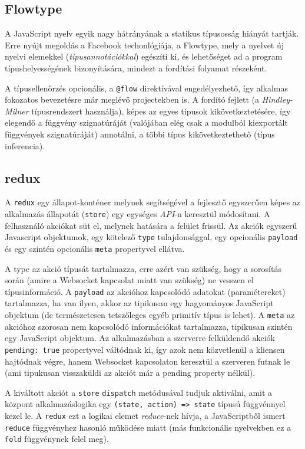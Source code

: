 \documentclass[12pt]{article}
\begin{document}
\subsection{Flowtype}

A JavaScript nyelv egyik nagy hátrányának a statikus típusosság hiányát tartják.
Erre nyújt megoldás a Facebook techonlógiája, a Flowtype\cite{flowtype}, mely a nyelvet
új nyelvi elemekkel (\emph{típusannotációkkal}) egészíti ki, és lehetőséget ad a program
típushelyességének bizonyítására, mindezt a fordítási folyamat részeként.

A típusellenőrzés opcionális, a \texttt{@flow} direktívával engedélyezhető, így alkalmas
fokozatos bevezetésre már meglévő projectekben is.
A fordító fejlett (a \emph{Hindley-Milner}\cite{hindley-milner} típusrendszert használja), képes az egyes típusok kikövetkeztetésére, így elegendő
a függvény szignatúráját (valójában elég csak a modulból kiexportált függvények
szignatúráját) annotálni, a többi típus kikövetkeztethető (típus inferencia).

\subsection{redux}

A \texttt{redux}\cite{redux} egy állapot-konténer melynek segítségével a fejlesztő egyszerűen képes
az alkalmazás állapotát (\texttt{store}) egy egységes \emph{API}-n keresztül módosítani.
A felhasználó akciókat süt el, melynek hatására a felület frissül.
Az akciók egyszerű Javascript objektumok, egy kötelező \texttt{type} tulajdonsággal,
egy opcionális \texttt{payload} és egy szintén opcionális \texttt{meta} propertyvel ellátva.

A type az akció típusát tartalmazza, erre azért van szükség, hogy a sorosítás
során (amire a Websocket kapcsolat miatt van szükség) ne vesszen el
típusinformáció.
A \texttt{payload} az akcióhoz kapcsolódó adatokat (paramétereket) tartalmazza,
ha van ilyen, akkor az tipikusan egy hagyományos JavaScript objektum (de
természetesen tetszőleges egyéb primitív típus is lehet).
A \texttt{meta} az akcióhoz szorosan nem kapcsolódó információkat tartalmazza, tipikusan
szintén egy JavaScript objektum.
Az alkalmazásban a szerverre felküldendő akciók \texttt{pending: true} propertyvel
váltódnak ki, így azok nem közvetlenül a kliensen hajtódnak végre, hanem
Websocket kapcsolaton keresztül a szerveren futnak le (ami tipukusan visszaküldi az
akciót már a pending property nélkül).

A kiváltott akciót a \texttt{store} \texttt{dispatch} metódusával tudjuk aktiválni,
amit a központ alkalmazáslogika egy \texttt{(state, action) => state} típusú
függvénnyel kezel le. A \texttt{redux} ezt a logikai elemet \emph{reduce}-nek hívja,
a JavaScriptből ismert \texttt{reduce} függvényhez hasonló működése miatt (más funkcionális nyelvekben
ez a \texttt{fold} függvénynek felel meg).
\end{document}
